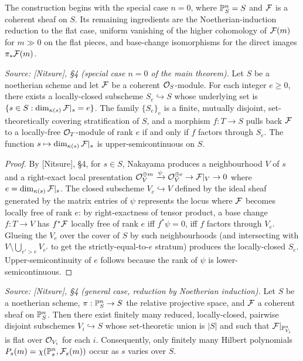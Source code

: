 The construction begins with the special case \(n = 0\), where
\(\mathbb{P}^n_S = S\) and \(\mathcal{F}\) is a coherent sheaf on \(S\).  Its remaining
ingredients are the Noetherian-induction reduction to the flat case, uniform
vanishing of the higher cohomology of \(\mathcal{F}(m)\) for \(m \gg 0\) on the flat
pieces, and base-change isomorphisms for the direct images \(\pi_*\mathcal{F}(m)\).

\begin{lemma}
  \label{lem:flat_locus_open}
  \textit{Source: [Nitsure], \S4 (special case \(n=0\) of the main theorem).}
  Let \(S\) be a noetherian scheme and let \(\mathcal{F}\) be a coherent \(\mathcal{O}_S\)-module.
  For each integer \(e \ge 0\), there exists a locally-closed subscheme
  \(S_e \hookrightarrow S\) whose underlying set is
  \(\{s \in S : \dim_{\kappa(s)} \mathcal{F}|_s = e\}\). The family \(\{S_e\}_e\) is a
  finite, mutually disjoint, set-theoretically covering stratification of \(S\),
  and a morphism \(f : T \to S\) pulls back \(\mathcal{F}\) to a locally-free
  \(\mathcal{O}_T\)-module of rank \(e\) if and only if \(f\) factors through \(S_e\).  The
  function \(s \mapsto \dim_{\kappa(s)} \mathcal{F}|_s\) is upper-semicontinuous on \(S\).
\end{lemma}

\begin{proof}
  By [Nitsure], \S4, for \(s \in S\), Nakayama produces a
  neighbourhood \(V\) of \(s\) and a right-exact local presentation
  \(\mathcal{O}_V^{\oplus m} \xrightarrow{\psi} \mathcal{O}_V^{\oplus e} \to \mathcal{F}|_V \to 0\) where
  \(e = \dim_{\kappa(s)} \mathcal{F}|_s\).  The closed subscheme \(V_e \hookrightarrow V\)
  defined by the ideal sheaf generated by the matrix entries of \(\psi\)
  represents the locus where \(\mathcal{F}\) becomes locally free of rank \(e\): by
  right-exactness of tensor product, a base change \(f : T \to V\) has
  \(f^* \mathcal{F}\) locally free of rank \(e\) iff \(f^* \psi = 0\), iff \(f\) factors
  through \(V_e\).  Glueing the \(V_e\) over the cover of \(S\) by such
  neighbourhoods (and intersecting with \(V \setminus \bigcup_{e' > e} V_{e'}\)
  to get the strictly-equal-to-\(e\) stratum) produces the locally-closed
  \(S_e\). Upper-semicontinuity of \(e\) follows because the rank of \(\psi\) is
  lower-semicontinuous.
\end{proof}

\begin{lemma}
  \label{lem:nonflat_locus_proper}
  \textit{Source: [Nitsure], \S4 (general case, reduction by Noetherian induction).}
  Let \(S\) be a noetherian scheme, \(\pi : \mathbb{P}^n_S \to S\) the relative projective
  space, and \(\mathcal{F}\) a coherent sheaf on \(\mathbb{P}^n_S\).  Then there exist finitely many
  reduced, locally-closed, pairwise disjoint subschemes \(V_i \hookrightarrow S\)
  whose set-theoretic union is \(|S|\) and such that \(\mathcal{F}|_{\mathbb{P}^n_{V_i}}\) is
  flat over \(\mathcal{O}_{V_i}\) for each \(i\). Consequently, only finitely many
  Hilbert polynomials \(P_s(m) = \chi(\mathbb{P}^n_s, \mathcal{F}_s(m))\) occur as \(s\) varies
  over \(S\).
\end{lemma}

